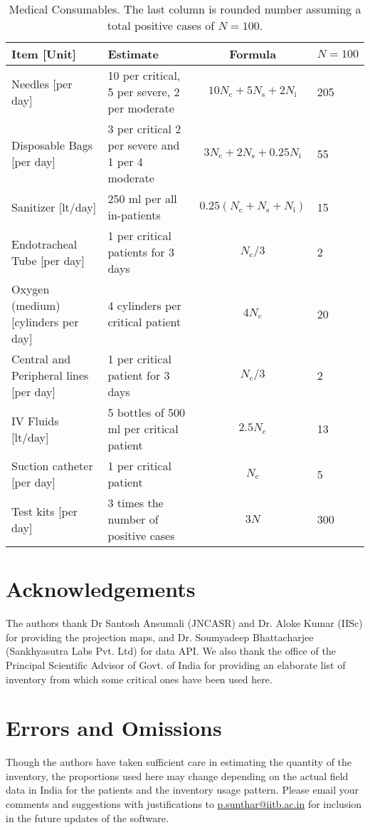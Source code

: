 \documentclass{article}
\newcommand{\email}[1]{\href{mailto:#1}{#1}}
\newcommand{\nc}{\ensuremath{N_{\mathrm{c}}}}
\newcommand{\ns}{\ensuremath{N_{\mathrm{s}}}}
\newcommand{\nin}{\ensuremath{N_{\mathrm{i}}}}
\begin{document}
\begin{landscape}
\begin{table}
  \caption{Medical Consumables. The last column is
    rounded number assuming a total positive cases of $N=100$.}
  \begin{tabularx}{\linewidth}{XXcl}
    \toprule
    Item [Unit] & Estimate & Formula & $N=100$ \\
    \midrule
Needles [per day]& 10 per critical, 5 per severe, 2 per moderate&
$10 \nc + 5 \ns + 2 \nin$ & 205 \\
Disposable Bags [per day] & 3 per critical 2 per severe and 1 per 4
moderate & $ 3\nc + 2\ns + 0.25\nin$ & 55 \\
Sanitizer [lt/day] & 250 ml per all in-patients & $0.25 (\nc+\ns+\nin)$
& 15 \\
Endotracheal Tube [per day] & 1 per critical patients for 3 days &
$\nc/3$ & 2 \\
Oxygen (medium) [cylinders per day] & 4 cylinders per critical patient
& $4 \nc$  & 20 \\ 
Central and Peripheral lines [per day] & 1 per critical patient for 3
days & $\nc/3$ & 2 \\
IV Fluids [lt/day] & 5 bottles of 500 ml per critical patient &
$2.5 \nc$ & 13 \\
Suction catheter [per day] & 1 per critical patient & $\nc$ & 5 \\
Test kits [per day] & 3 times the number of positive cases &
$3 N$ & 300  \\
\bottomrule
\end{tabularx}
\end{table}
\end{landscape}

\section{Acknowledgements}
The authors thank Dr Santosh Ansumali (JNCASR) and Dr. Aloke Kumar
(IISc) for providing the projection maps, and Dr. Soumyadeep
Bhattacharjee (Sankhyasutra Labs Pvt. Ltd) for data API. We also thank
the office of the Principal Scientific Advisor of Govt. of India for
providing an elaborate list of inventory from which some critical ones
have been used here.

\section{Errors and Omissions}
Though the authors have taken sufficient care in estimating the
quantity of the inventory, the proportions used here may change
depending on the actual field data in India for the patients and the
inventory usage pattern.  Please email your comments and suggestions
with justifications to \email{p.sunthar@iitb.ac.in} for inclusion in the
future updates of the software.




\end{document}
